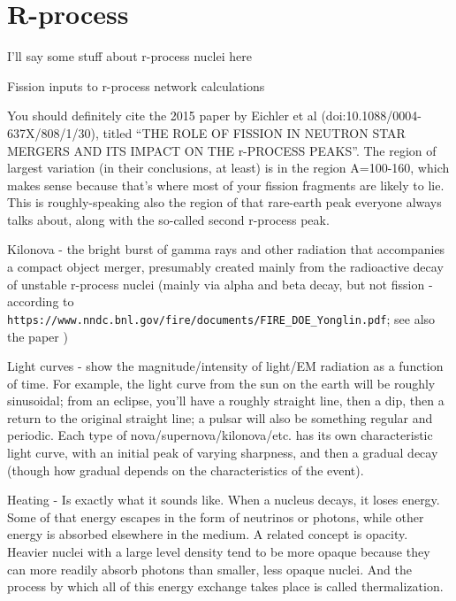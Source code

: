 \chapter{R-process}\label{chap:rprocess}

\maketitle
I'll say some stuff about r-process nuclei here

Fission inputs to r-process network calculations

You should definitely cite the 2015 paper by Eichler et al (doi:10.1088/0004-637X/808/1/30), titled ``THE ROLE OF FISSION IN NEUTRON STAR MERGERS AND ITS IMPACT ON THE r-PROCESS PEAKS''. The region of largest variation (in their conclusions, at least) is in the region A=100-160, which makes sense because that's where most of your fission fragments are likely to lie. This is roughly-speaking also the region of that rare-earth peak everyone always talks about, along with the so-called second r-process peak.

Kilonova - the bright burst of gamma rays and other radiation that accompanies a compact object merger, presumably created mainly from the radioactive decay of unstable r-process nuclei (mainly via alpha and beta decay, but not fission - according to \verb|https://www.nndc.bnl.gov/fire/documents/FIRE_DOE_Yonglin.pdf|; see also the paper \cite{Zhu2018})

Light curves - show the magnitude/intensity of light/EM radiation as a function of time. For example, the light curve from the sun on the earth will be roughly sinusoidal; from an eclipse, you'll have a roughly straight line, then a dip, then a return to the original straight line; a pulsar will also be something regular and periodic. Each type of nova/supernova/kilonova/etc. has its own characteristic light curve, with an initial peak of varying sharpness, and then a gradual decay (though how gradual depends on the characteristics of the event).

Heating - Is exactly what it sounds like. When a nucleus decays, it loses energy. Some of that energy escapes in the form of neutrinos or photons, while other energy is absorbed elsewhere in the medium. A related concept is opacity. Heavier nuclei with a large level density tend to be more opaque because they can more readily absorb photons than smaller, less opaque nuclei. And the process by which all of this energy exchange takes place is called thermalization.

